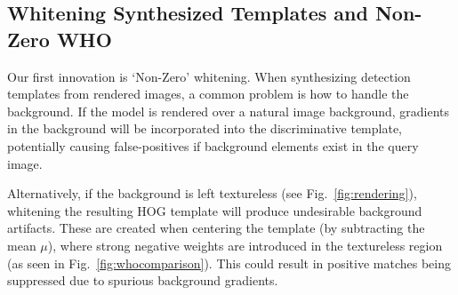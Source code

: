 
% 



\subsection{Whitening Synthesized Templates and Non-Zero WHO}
\label{sec:nzwho}
Our first innovation is `Non-Zero' whitening. When synthesizing detection
templates from rendered images, a common problem is how to handle the
background. If the model is rendered over a natural image background, gradients
in the background will be incorporated into the discriminative template,
potentially causing false-positives if background elements exist in the query
image.

Alternatively, if the background is left textureless (see
Fig.~\ref{fig:rendering}), whitening the resulting HOG template
will produce undesirable background artifacts. These are created when centering
the template (by subtracting the mean $\mu$), where strong negative weights are
introduced in the textureless region (as seen in Fig.~\ref{fig:whocomparison}).
This could result in positive matches being suppressed due to spurious
background gradients.

